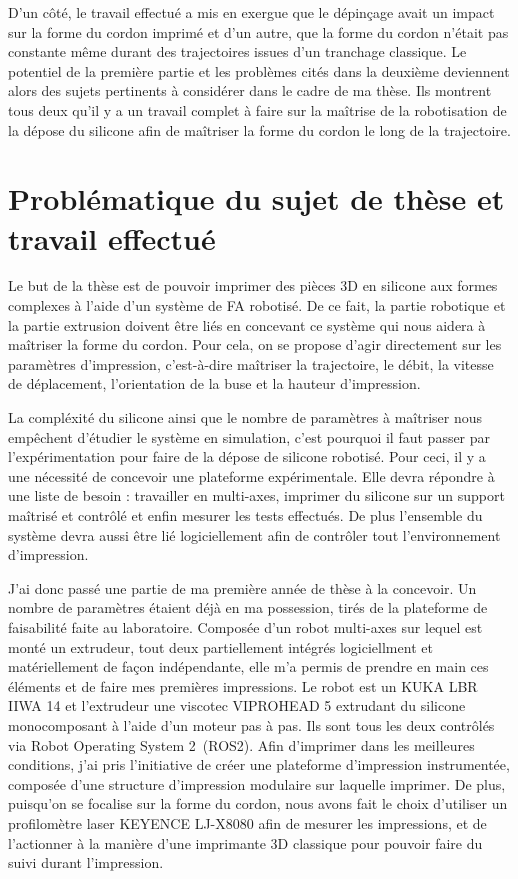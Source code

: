 \documentclass[11pt,a4paper]{article}
\begin{document}
    D'un côté, le travail effectué a mis en exergue que le dépinçage avait un impact sur la forme du cordon imprimé et d'un autre, que la  forme du cordon n'était pas constante même durant des trajectoires issues d'un tranchage classique. Le potentiel de la première partie et les problèmes cités dans la deuxième deviennent alors des sujets pertinents à considérer dans le cadre de ma thèse. Ils montrent tous deux qu'il y a un travail complet à faire sur la maîtrise de la robotisation de la dépose du silicone afin de maîtriser la forme du cordon le long de la trajectoire.


\section*{Problématique du sujet de thèse et travail effectué}
    
        Le but de la thèse est de pouvoir imprimer des pièces 3D en silicone aux formes complexes à l'aide d'un système de FA robotisé. De ce fait, la partie robotique et la partie extrusion doivent être liés en concevant ce système qui nous aidera à maîtriser la forme du cordon. Pour cela, on se propose d'agir directement sur les paramètres d'impression, c'est-à-dire maîtriser la trajectoire, le débit, la vitesse de déplacement, l'orientation de la buse et la hauteur d'impression. 

        La compléxité du silicone ainsi que le nombre de paramètres à maîtriser nous empêchent d'étudier le système en simulation, c'est pourquoi il faut passer par l'expérimentation pour faire de la dépose de silicone robotisé. Pour ceci, il y a une nécessité de concevoir une plateforme expérimentale. Elle devra répondre à une liste de besoin : travailler en multi-axes, imprimer du silicone sur un support maîtrisé et contrôlé et enfin mesurer les tests effectués. De plus l'ensemble du système devra aussi être lié logiciellement afin de contrôler tout l'environnement d'impression.  
        
        J'ai donc passé une partie de ma première année de thèse à la concevoir. Un nombre de paramètres étaient déjà en ma possession, tirés de la plateforme de faisabilité faite au laboratoire. Composée d'un robot multi-axes sur lequel est monté un extrudeur, tout deux partiellement intégrés logiciellment et matériellement de façon indépendante, elle m'a permis de prendre en main ces éléments et de faire mes premières impressions. Le robot est un KUKA LBR IIWA 14 et l'extrudeur une viscotec VIPROHEAD 5 extrudant du silicone monocomposant à l'aide d'un moteur pas à pas. Ils sont tous les deux contrôlés via Robot Operating System 2~(ROS2). Afin d'imprimer dans les meilleures conditions, j'ai pris l'initiative de créer une plateforme d'impression instrumentée, composée d'une structure d'impression modulaire sur laquelle imprimer. De plus, puisqu'on se focalise sur la forme du cordon, nous avons fait le choix d'utiliser un profilomètre laser KEYENCE LJ-X8080 afin de mesurer les impressions, et de l'actionner à la manière d'une imprimante 3D classique pour pouvoir faire du suivi durant l'impression. 
\end{document}
